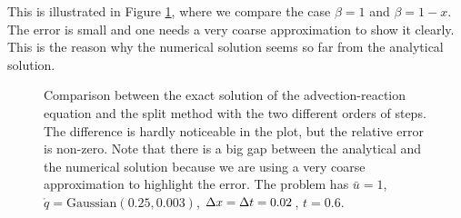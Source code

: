 \documentclass[journal,onecolumn]{IEEEtran}
\begin{document}
This is illustrated in Figure \ref{fig:AB}, where we compare the case $\beta=1$ and $\beta=1-x$. The error is small and one needs a very coarse approximation to show it clearly. This is the reason why the numerical solution seems so far from the analytical solution.

\begin{figure}[!ht]
	\centering

	\caption{Comparison between the exact solution of the advection-reaction equation and the split method with the two different orders of steps. The difference is hardly noticeable in the plot, but the relative error is non-zero. Note that there is a big gap between the analytical  and the numerical solution because we are using a very coarse approximation to highlight the error. The problem has $\bar{u}=1$, $\mathring{q}=\text{Gaussian}(0.25,0.003)$, $\Delta x = \Delta t = 0.02$, $t=0.6$.}
	\label{fig:AB}
\end{figure}
\end{document}
